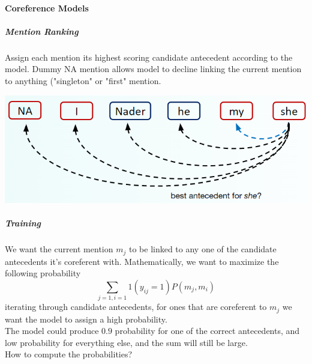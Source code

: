 \documentclass[10pt]{report}
\begin{document}
\paragraph{Coreference Models}
\subparagraph{Mention Ranking} Assign each mention its highest scoring candidate antecedent according to the model. Dummy NA mention allows model to decline linking the current mention to anything ("singleton" or "first" mention.
\begin{center}
	\includegraphics[scale=0.5]{110.png}
\end{center}
\subparagraph{Training} We want the current mention $m_j$ to be linked to any one of the candidate antecedents it's coreferent with. Mathematically, we want to maximize the following probability
$$\sum_{j=1,i=1}1(y_{ij}=1)P(m_j,m_i)$$
iterating through candidate antecedents, for ones that are coreferent to $m_j$ we want the model to assign a high probability.\\
The model could produce $0.9$ probability for one of the correct antecedents, and low probability for everything else, and the sum will still be large.\\
How to compute the probabilities?
\end{document}
